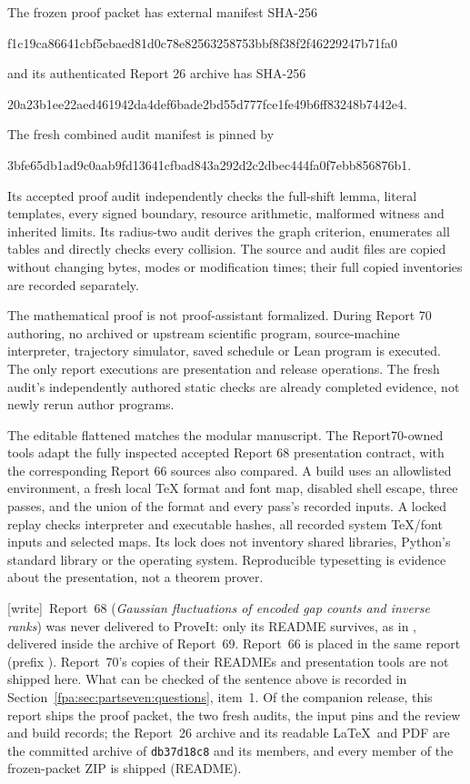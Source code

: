\documentclass[11pt,a4paper]{article}
\numberwithin{equation}{section}
\newcommand{\file}[1]{\texttt{\detokenize{#1}}}
\newcommand{\wtag}{\textup{[write]}}
\begin{document}
The frozen proof packet has external manifest SHA-256
\begin{center}\footnotesize\ttfamily
f1c19ca86641cbf5ebaed81d0c78e82563258753bbf8f38f2f46229247b71fa0
\end{center}
and its authenticated Report 26 archive has SHA-256
\begin{center}\footnotesize\ttfamily
20a23b1ee22aed461942da4def6bade2bd55d777fce1fe49b6ff83248b7442e4.
\end{center}
The fresh combined audit manifest is pinned by
\begin{center}\footnotesize\ttfamily
3bfe65db1ad9c0aab9fd13641cfbad843a292d2c2dbec444fa0f7ebb856876b1.
\end{center}
Its accepted proof audit independently checks the full-shift lemma, literal templates, every signed boundary, resource arithmetic, malformed witness and inherited limits. Its radius-two audit derives the graph criterion, enumerates all tables and directly checks every collision. The source and audit files are copied without changing bytes, modes or modification times; their full copied inventories are recorded separately.

The mathematical proof is not proof-assistant formalized. During Report 70 authoring, no archived or upstream scientific program, source-machine interpreter, trajectory simulator, saved schedule or Lean program is executed. The only report executions are presentation and release operations. The fresh audit's independently authored static checks are already completed evidence, not newly rerun author programs.

The editable flattened \file{Report70.tex} matches the modular manuscript. The Report70-owned tools adapt the fully inspected accepted Report 68 presentation contract, with the corresponding Report 66 sources also compared. A build uses an allowlisted environment, a fresh local TeX format and font map, disabled shell escape, three passes, and the union of the format and every pass's recorded inputs. A locked replay checks interpreter and executable hashes, all recorded system TeX/font inputs and selected maps. Its lock does not inventory shared libraries, Python's standard library or the operating system. Reproducible typesetting is evidence about the presentation, not a theorem prover.

\wtag\ Report~68 (\emph{Gaussian fluctuations of encoded gap counts and inverse ranks}) was never delivered to ProveIt: only its README survives, as  in , delivered inside the archive of Report~69. Report~66 is placed in the same report (prefix ). Report~70's copies of their READMEs and presentation tools are not shipped here. What can be checked of the sentence above is recorded in Section~\ref{fpa:sec:partseven:questions}, item~1. Of the companion release, this report ships the proof packet, the two fresh audits, the input pins and the review and build records; the Report~26 archive and its readable \LaTeX\ and PDF are the committed archive of \texttt{db37d18c8} and its members, and every member of the frozen-packet ZIP is shipped (README).
\end{document}
